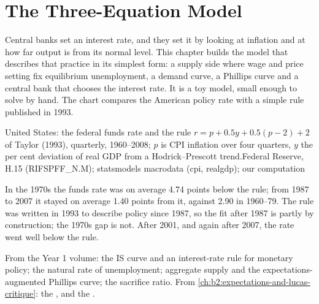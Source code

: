 \chapter{The Three-Equation Model}\label{ch:b2:three-equation-model}

Central banks set an interest rate, and they set it by looking at inflation and at how far output is from its normal
level. This chapter builds the model that describes that practice in its simplest form: a supply side where wage and price
setting fix equilibrium unemployment, a demand curve, a Phillips curve and a central bank that chooses the interest rate.
It is a toy model, small enough to solve by hand. The chart compares the American policy rate with a simple rule published
in 1993.

\begin{openingchart}{United States: the federal funds rate and the rule $r = p + 0.5y + 0.5(p - 2) + 2$ of Taylor (1993), quarterly, 1960--2008; $p$ is CPI inflation over four quarters,
  $y$ the per cent deviation of real GDP from a Hodrick--Prescott trend.}{Federal Reserve, H.15 (RIFSPFF\_N.M); statsmodels
  macrodata (cpi, realgdp); our computation}
\end{openingchart}

In the 1970s the funds rate was on average 4.74 points below the rule; from 1987 to 2007 it stayed on average 1.40 points from it,
against 2.90 in 1960--79. The rule was written in 1993 to describe policy since 1987, so the fit after 1987 is partly by
construction; the 1970s gap is not. After 2001, and again after 2007, the rate went well below the rule.

\begin{recall}
From the Year 1 volume: the IS curve and an interest-rate rule for monetary policy; the natural rate of unemployment;
aggregate supply and the expectations-augmented Phillips curve; the sacrifice ratio. From
\cref{ch:b2:expectations-and-lucas-critique}: the ,  and the .
\end{recall}

